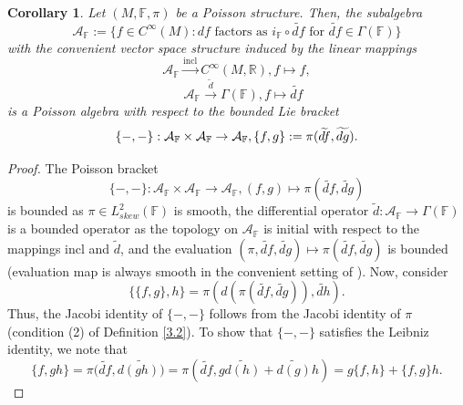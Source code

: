 \documentclass[11pt,reqno]{amsart}
\newtheorem{corollary}[theorem]{Corollary}
\theoremstyle{definition}
\numberwithin{equation}{section}
\begin{document}
 \begin{corollary}\label{Poisson algebra}
 Let $(M,\mathbb F, \pi)$ be a Poisson structure. Then, the subalgebra 
 $$\mathcal A_{\mathbb F}:=\{f\in C^{\infty}(M): df \text{ factors as } i_{\mathbb F}\circ\widetilde{df} \text{ for  } \widetilde{df}\in \Gamma(\mathbb F)\}$$
with the convenient vector space structure induced by the linear mappings 
\begin{equation*}    
 \mathcal A_\mathbb F \xrightarrow{\operatorname{incl}} C^{\infty}(M,\mathbb R), f\mapsto f,\end{equation*}
$$\quad  
 \mathcal A_\mathbb F \xrightarrow {\widetilde{d}} \Gamma(\mathbb F), f\mapsto \widetilde{df}$$  is a Poisson algebra with respect to the bounded Lie bracket  $$\{-,-\}:\mathcal A_{\mathbb F}\times \mathcal A_{\mathbb F}\to \mathcal A_{\mathbb F}\\ , \{f, g\} := \pi(\widetilde{df}, \widetilde{dg}).$$
 \end{corollary}
 \begin{proof}
 The Poisson bracket \[\{-, -\}: \mathcal{A}_{\mathbb F} \times \mathcal{A}_{\mathbb F} \rightarrow \mathcal{A}_{\mathbb F}, (f,g)\mapsto \pi(\widetilde{df},\widetilde{dg})\] is bounded as $\pi \in L^2_{skew}(\mathbb F)$ is smooth, the differential operator $\widetilde d :\mathcal A_{\mathbb F}\to \Gamma(\mathbb F)$ is a bounded operator as the topology on $\mathcal A_{\mathbb F}$ is initial with respect to the mappings $\text{incl}$ and $\widetilde{d}$, and the evaluation $ (\pi,   \widetilde{df}, \widetilde{dg})\mapsto \pi(\widetilde{df}, \widetilde{dg})$ is bounded (evaluation map is always smooth in the convenient setting of \cite[Corollary 3.13]{20}). Now, consider 
\[ \{\{f,g\},h\}=\pi(d(\pi(\widetilde{df}, \widetilde{dg})),\widetilde{dh}).\] Thus, the Jacobi identity of $\{-,-\}$ follows from the Jacobi identity of $\pi$ (condition (2) of Definition \ref{3.2}).
To show that $\{-,-\}$ satisfies the Leibniz identity, we note that \[
\{f,gh\}=\pi(\widetilde{df}, \widetilde{d(gh))}=\pi(\widetilde{df}, g\widetilde{d(h)}+\widetilde{d(g)}h)=g\{f,h\}+\{f,g\}h.
\]
 \end{proof}
\end{document}
